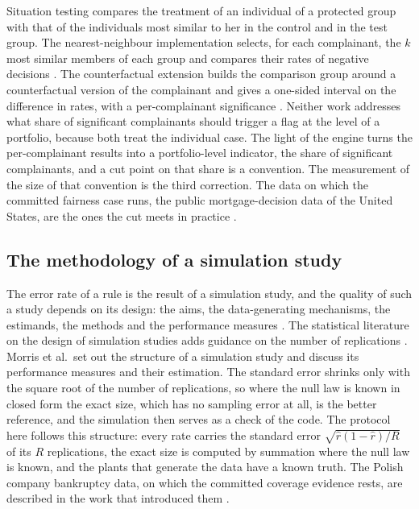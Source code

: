 Situation testing compares the treatment of an individual of a protected group with that of the individuals most similar to her in the control and in the test group. The nearest-neighbour implementation selects, for each complainant, the $k$ most similar members of each group and compares their rates of negative decisions \citep{luong2011}. The counterfactual extension builds the comparison group around a counterfactual version of the complainant and gives a one-sided interval on the difference in rates, with a per-complainant significance \citep{alvarez2025}. Neither work addresses what share of significant complainants should trigger a flag at the level of a portfolio, because both treat the individual case. The light of the engine turns the per-complainant results into a portfolio-level indicator, the share of significant complainants, and a cut point on that share is a convention. The measurement of the size of that convention is the third correction. The data on which the committed fairness case runs, the public mortgage-decision data of the United States, are the ones the cut meets in practice \citep{hmda2018}.

\subsection{The methodology of a simulation study}

The error rate of a rule is the result of a simulation study, and the quality of such a study depends on its design: the aims, the data-generating mechanisms, the estimands, the methods and the performance measures \citep{morris2019}. The statistical literature on the design of simulation studies adds guidance on the number of replications \citep{burton2006}. Morris et al.\ set out the structure of a simulation study and discuss its performance measures and their estimation. The standard error shrinks only with the square root of the number of replications, so where the null law is known in closed form the exact size, which has no sampling error at all, is the better reference, and the simulation then serves as a check of the code. The protocol here follows this structure: every rate carries the standard error $\sqrt{\hat r(1-\hat r)/R}$ of its $R$ replications, the exact size is computed by summation where the null law is known, and the plants that generate the data have a known truth. The Polish company bankruptcy data, on which the committed coverage evidence rests, are described in the work that introduced them \citep{zieba2016}.

